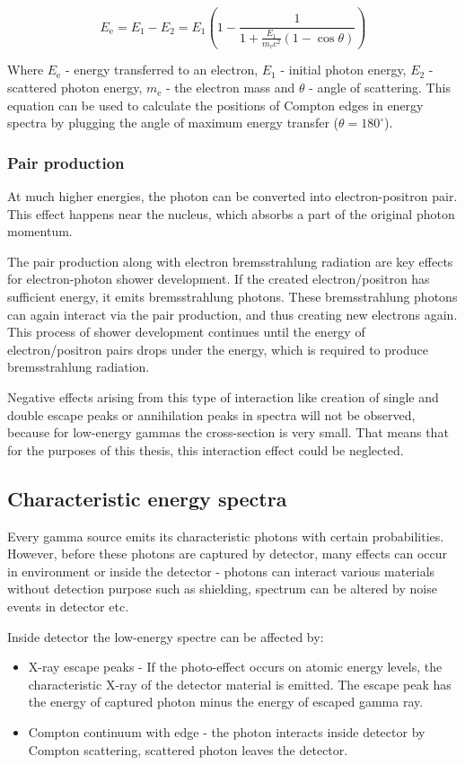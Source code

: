\begin{equation}
E_{\textrm{e}} = E_1 - E_2 = E_1 (1- \frac{1}{1+\frac{E_1}{m_{\textrm{e}}c^2}(1 - \cos{\theta})})
\end{equation}


\par
Where $E_{\textrm{e}}$ - energy transferred to an electron, $E_1$ - initial photon energy, $E_2$ - scattered photon energy, $m_{\textrm{e}}$ - the electron mass and $\theta$ - angle of scattering. This equation can be used to calculate the positions of Compton edges in energy spectra by plugging the angle of maximum energy transfer ($\theta = 180^\circ$).


\subsubsection{Pair production}
At much higher energies, the photon can be converted into electron-positron pair. This effect happens near the nucleus, which absorbs a part of the original photon momentum.
\par
The pair production along with electron bremsstrahlung radiation  are key effects for electron-photon shower development. If the created electron/positron has sufficient energy, it emits bremsstrahlung photons. These bremsstrahlung photons can again interact via the pair production, and thus creating new electrons again. This process of shower development continues until the energy of electron/positron pairs drops under the energy, which is required to produce bremsstrahlung radiation.
\par
Negative effects arising from this type of interaction like creation of single and double escape peaks or annihilation peaks in spectra will not be observed, because for low-energy gammas the cross-section is very small. That means that for the purposes of this thesis, this interaction effect could be neglected.   


\subsection{Characteristic energy spectra}
Every gamma source emits its characteristic photons with certain probabilities. However, before these photons are captured by detector, many effects can occur in environment or inside the detector - photons can interact various materials without detection purpose such as shielding, spectrum can be altered by 
noise events in detector etc.
\par
Inside detector the low-energy spectre can be affected by:
\begin{itemize}
\item X-ray escape peaks - If the photo-effect occurs on atomic energy levels, the characteristic X-ray of the detector material is emitted. The escape peak has the energy of captured photon minus the energy of escaped gamma ray.
\item Compton continuum with edge - the photon interacts inside detector by Compton scattering, scattered photon leaves the detector.

\end{itemize}

